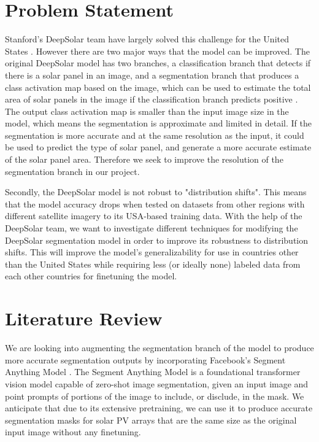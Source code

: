 \documentclass[10pt,twocolumn,letterpaper]{article}
\begin{document}
\section{Problem Statement}
Stanford's DeepSolar team have largely solved this challenge for the United States \cite{DeepSolar1} \cite{DeepSolar2}. However there are two major ways that the model can be improved. The original DeepSolar model has two branches, a classification branch that detects if there is a solar panel in an image, and a segmentation branch that produces a class activation map based on the image, which can be used to estimate the total area of solar panels in the image if the classification branch predicts positive \cite{DeepSolar1}. The output class activation map is smaller than the input image size in the model, which means the segmentation is approximate and limited in detail. If the segmentation is more accurate and at the same resolution as the input, it could be used to predict the type of solar panel, and generate a more accurate estimate of the solar panel area. Therefore we seek to improve the resolution of the segmentation branch in our project.

Secondly, the DeepSolar model is not robust to "distribution shifts". This means that the model accuracy drops when tested on datasets from other regions with different satellite imagery to its USA-based training data. With the help of the DeepSolar team, we want to investigate different techniques for modifying the DeepSolar segmentation model in order to improve its robustness to distribution shifts. This will improve the model's generalizability for use in countries other than the United States while requiring less (or ideally none) labeled data from each other countries for finetuning the model.


\section{Literature Review}
 
We are looking into augmenting the segmentation branch of the model to produce more accurate segmentation outputs by incorporating Facebook's Segment Anything Model \cite{kirillov2023segment}. The Segment Anything Model is a foundational transformer vision model capable of zero-shot image segmentation, given an input image and point prompts of portions of the image to include, or disclude, in the mask. We anticipate that due to its extensive pretraining, we can use it to produce accurate segmentation masks for solar PV arrays that are the same size as the original input image without any finetuning.
\end{document}
